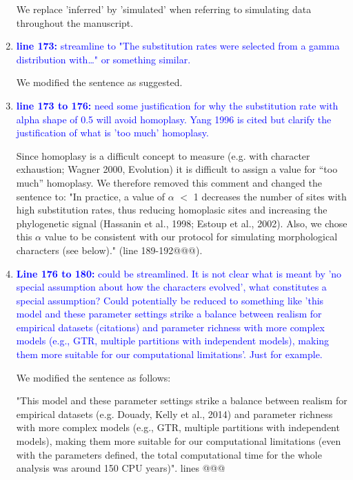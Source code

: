\documentclass[12pt,letterpaper]{article}
\begin{document}
\begin{enumerate}
We replace 'inferred' by 'simulated' when referring to simulating data throughout the manuscript.

\item{\textcolor{blue}{\textbf{line 173:} streamline to "The substitution rates were selected from a gamma distribution with…" or something similar. }}

We modified the sentence as suggested.

\item{\textcolor{blue}{\textbf{line 173 to 176:} need some justification for why the substitution rate with alpha shape of 0.5 will avoid homoplasy. Yang 1996 is cited but clarify the justification of what is 'too much' homoplasy. }}

Since homoplasy is a difficult concept to measure (e.g. with character exhaustion; Wagner 2000, Evolution) it is difficult to assign a value for ``too much'' homoplasy.
We therefore removed this comment and changed the sentence to:
"In practice, a value of $\alpha$ $<$ 1 decreases the number of sites with high substitution rates, thus reducing homoplasic sites and increasing the phylogenetic signal (Hassanin et al., 1998; Estoup et al., 2002).%
Also, we chose this $\alpha$ value to be consistent with our protocol for simulating morphological characters (see below)." (line 189-192@@@).

\item{\textcolor{blue}{\textbf{Line 176 to 180:} could be streamlined. It is not clear what is meant by 'no special assumption about how the characters evolved', what constitutes a special assumption? Could potentially be reduced to something like 'this model and these parameter settings strike a balance between realism for empirical datasets (citations) and parameter richness with more complex models (e.g., GTR, multiple partitions with independent models), making them more suitable for our computational limitations'. Just for example.}}

We modified the sentence as follows:

"This model and these parameter settings strike a balance between realism for empirical datasets  (e.g. Douady, Kelly et al., 2014) and parameter richness with more complex models (e.g., GTR, multiple partitions with independent models), making them more suitable for our computational limitations (even with the parameters defined, the total computational time for the whole analysis was around 150 CPU years)". lines @@@


\end{enumerate}
\end{document}
